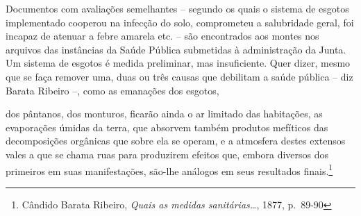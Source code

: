 Documentos com avaliações semelhantes -- segundo os quais o sistema de
esgotos implementado cooperou na infecção do solo, comprometeu a
salubridade geral, foi incapaz de atenuar a febre amarela etc. -- são
encontrados aos montes nos arquivos das instâncias da Saúde Pública
submetidas à administração da Junta. Um sistema de esgotos é medida
preliminar, mas insuficiente. Quer dizer, mesmo que se faça remover uma,
duas ou três causas que debilitam a saúde pública -- diz Barata Ribeiro
--, como as emanações dos esgotos,

dos pântanos, dos monturos, ficarão ainda o ar limitado das habitações,
as evaporações úmidas da terra, que absorvem também produtos mefíticos
das decomposições orgânicas que sobre ela se operam, e a atmosfera
destes extensos vales a que se chama ruas para produzirem efeitos que,
embora diversos dos primeiros em suas manifestações, são-lhe análogos em
seus resultados finais.\footnote{Cândido Barata Ribeiro, \emph{Quais as
  medidas sanitárias\ldots{}}, 1877, p.~89-90}


